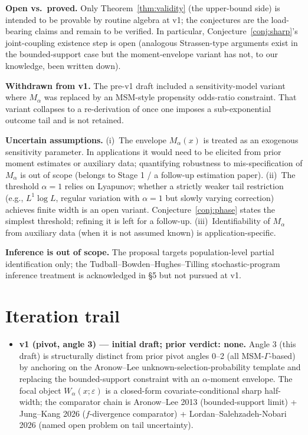 \documentclass[11pt]{article}
\theoremstyle{definition}
\theoremstyle{plain}
\theoremstyle{remark}
\begin{document}
\textbf{Open vs.~proved.} Only Theorem~\ref{thm:validity} (the upper-bound side) is
intended to be provable by routine algebra at v1; the conjectures are the load-bearing
claims and remain to be verified. In particular, Conjecture~\ref{conj:sharp}'s joint-coupling
existence step is open (analogous Strassen-type arguments exist in the bounded-support
case but the moment-envelope variant has not, to our knowledge, been written down).

\textbf{Withdrawn from v1.} The pre-v1 draft included a sensitivity-model variant where
$M_\alpha$ was replaced by an MSM-style propensity odds-ratio constraint. That variant
collapses to a re-derivation of \citet{KallusMaoZhou2019CATEIntervals} once one
imposes a sub-exponential outcome tail and is not retained.

\textbf{Uncertain assumptions.}
(i)~The envelope $M_\alpha(x)$ is treated as an exogenous sensitivity parameter. In
applications it would need to be elicited from prior moment estimates or auxiliary
data; quantifying robustness to mis-specification of $M_\alpha$ is out of scope
(belongs to Stage 1 / a follow-up estimation paper).
(ii)~The threshold $\alpha=1$ relies on Lyapunov; whether a strictly weaker tail
restriction (e.g., $L^1 \log L$, regular variation with $\alpha=1$ but slowly varying
correction) achieves finite width is an open variant. Conjecture~\ref{conj:phase}
states the simplest threshold; refining it is left for a follow-up.
(iii)~Identifiability of $M_\alpha$ from auxiliary data (when it is not assumed known)
is application-specific.

\textbf{Inference is out of scope.} The proposal targets population-level partial
identification only; the Tudball--Bowden--Hughes--Tilling stochastic-program
inference treatment is acknowledged in \S5 but not pursued at v1.

\section{Iteration trail}

\begin{itemize}[leftmargin=2em]
  \item \textbf{v1 (pivot, angle 3) --- initial draft; prior verdict: none.}
        Angle 3 (this draft) is structurally distinct from prior pivot angles 0--2 (all
        MSM-$\Gamma$-based) by anchoring on the Aronow--Lee unknown-selection-probability
        template and replacing the bounded-support constraint with an $\alpha$-moment
        envelope. The focal object $W_\alpha(x;\varepsilon)$ is a closed-form covariate-conditional
        sharp half-width; the comparator chain is Aronow--Lee 2013 (bounded-support limit) +
        Jung--Kang 2026 ($f$-divergence comparator) + Lordan--Salehzadeh-Nobari 2026 (named open
        problem on tail uncertainty).
\end{itemize}
\end{document}

